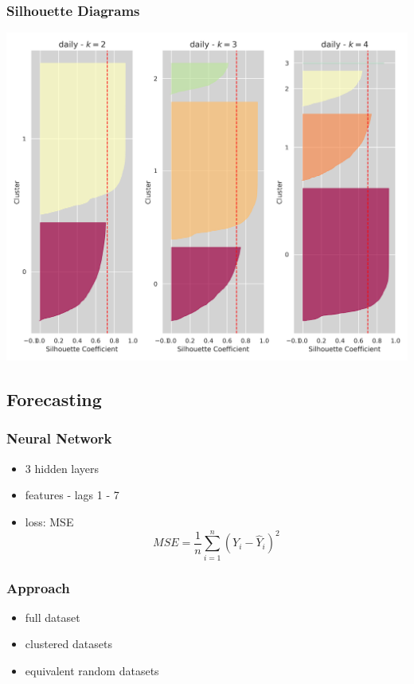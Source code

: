 \documentclass[11pt]{article}
\begin{document}
\subsubsection*{Silhouette Diagrams}
\label{sec:org95e89f6}
\begin{center}
\includegraphics[width=.9\linewidth]{../img/daily_kmeans_sil_dia_series.png}
\end{center}
\subsection*{Forecasting}
\label{sec:orgea3d9ed}
\subsubsection*{Neural Network}
\label{sec:org4250d06}
\begin{itemize}
\item 3 hidden layers
\item features - lags 1 - 7
\item loss: MSE
$$ MSE = \frac{1}{n} \sum_{i=1}^n (Y_i - \hat{Y}_i)^2 $$
\end{itemize}
\subsubsection*{Approach}
\label{sec:org0b93389}
\begin{itemize}
\item full dataset
\item clustered datasets
\item equivalent random datasets
\end{itemize}
\end{document}
